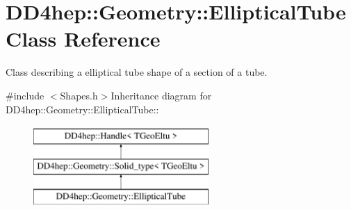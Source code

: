 \hypertarget{class_d_d4hep_1_1_geometry_1_1_elliptical_tube}{
\section{DD4hep::Geometry::EllipticalTube Class Reference}
\label{class_d_d4hep_1_1_geometry_1_1_elliptical_tube}
}


Class describing a elliptical tube shape of a section of a tube.  


{\ttfamily \#include $<$Shapes.h$>$}Inheritance diagram for DD4hep::Geometry::EllipticalTube::\begin{figure}[H]
\begin{center}
\leavevmode
\includegraphics[height=3cm]{class_d_d4hep_1_1_geometry_1_1_elliptical_tube}
\end{center}
\end{figure}

